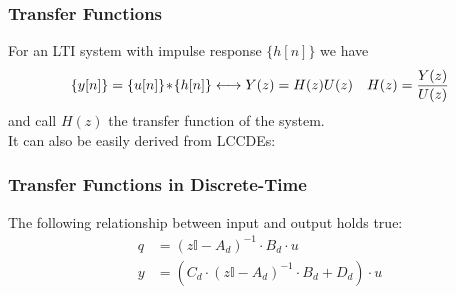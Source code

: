 \subsubsection{Transfer Functions}
    For an LTI system with impulse response $\{h[n] \}$ we have
    \begin{align*}
        \{y[n]\} = \{u[n]\}\!\ast\!\{h[n]\} \longleftrightarrow Y(z) =  H(z) U(z)&& H(z) = \frac{Y(z)}{U(z)}
    \end{align*}
    and call $H(z)$ the transfer function of the system.\\ It can also be easily derived from LCCDEs:

\subsubsection{Transfer Functions in Discrete-Time}
    The following relationship between input and output holds true:
    \begin{align*}
        q &= (z \mathbb{I} - A_d)^{-1} \cdot B_d \cdot u \\
        y &= (C_d \cdot (z \mathbb{I} - A_d)^{-1} \cdot B_d + D_d) \cdot u
    \end{align*}
    \vspace{-7pt}
